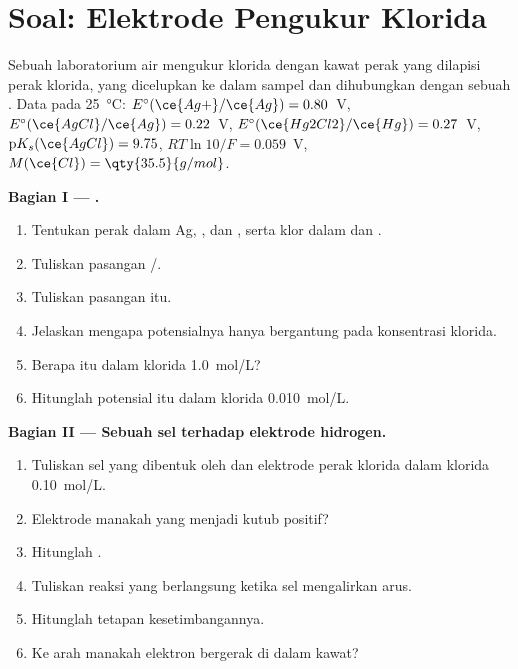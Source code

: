 \section{Soal: Elektrode Pengukur Klorida}

\begin{problem}
\label{pb:b1:nernst:1}
Sebuah laboratorium air mengukur klorida dengan kawat perak yang dilapisi
perak klorida, yang dicelupkan ke dalam sampel dan dihubungkan dengan
sebuah . Data pada \qty{25}{\celsius}:
$E^\circ(\ce{Ag+}/\ce{Ag}) = 0.80$~V,
$E^\circ(\ce{AgCl}/\ce{Ag}) = 0.22$~V, $E^\circ(\ce{Hg2Cl2}/\ce{Hg}) =
0.27$~V, $\mathrm{p}K_s(\ce{AgCl}) = 9.75$, $RT\ln 10/F = 0.059$~V,
$M(\ce{Cl}) = \qty{35.5}{g/mol}$.

\medskip
\noindent\textbf{Bagian I --- .}
\begin{enumerate}
  \item Tentukan  perak dalam Ag, , dan
        , serta  klor dalam  dan
        .
  \item Tuliskan  pasangan /.
  \item Tuliskan  pasangan itu.
  \item Jelaskan mengapa potensialnya hanya bergantung pada konsentrasi
        klorida.
  \item Berapa  itu dalam klorida \qty{1.0}{mol/L}?
  \item Hitunglah potensial itu dalam klorida \qty{0.010}{mol/L}.
\end{enumerate}

\medskip
\noindent\textbf{Bagian II --- Sebuah sel terhadap elektrode hidrogen.}
\begin{enumerate}[resume]
  \item Tuliskan sel yang dibentuk oleh  dan
        elektrode perak klorida dalam klorida \qty{0.10}{mol/L}.
  \item Elektrode manakah yang menjadi kutub positif?
  \item Hitunglah .
  \item Tuliskan reaksi yang berlangsung ketika sel mengalirkan arus.
  \item Hitunglah tetapan kesetimbangannya.
  \item Ke arah manakah elektron bergerak di dalam kawat?
\end{enumerate}


\end{problem}
